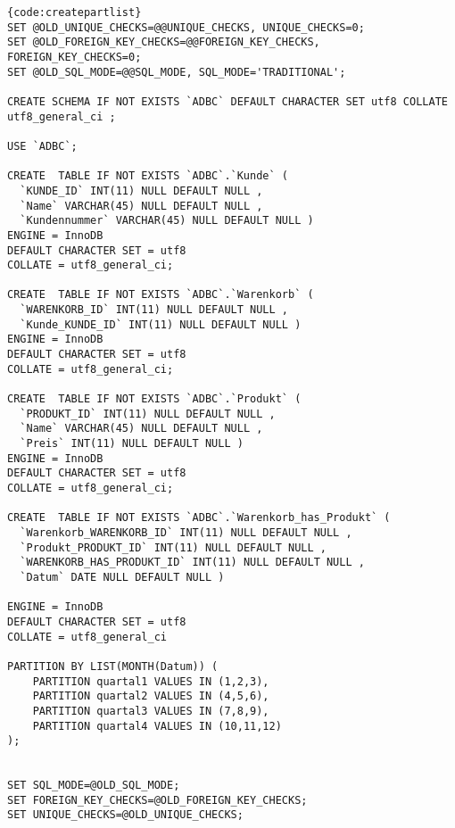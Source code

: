 \begin{lstlisting}[caption=Tabellenerzeugung mit List-Partitioning, firstnumber=1]{code:createpartlist}
SET @OLD_UNIQUE_CHECKS=@@UNIQUE_CHECKS, UNIQUE_CHECKS=0;
SET @OLD_FOREIGN_KEY_CHECKS=@@FOREIGN_KEY_CHECKS, FOREIGN_KEY_CHECKS=0;
SET @OLD_SQL_MODE=@@SQL_MODE, SQL_MODE='TRADITIONAL';

CREATE SCHEMA IF NOT EXISTS `ADBC` DEFAULT CHARACTER SET utf8 COLLATE utf8_general_ci ;

USE `ADBC`;

CREATE  TABLE IF NOT EXISTS `ADBC`.`Kunde` (
  `KUNDE_ID` INT(11) NULL DEFAULT NULL ,
  `Name` VARCHAR(45) NULL DEFAULT NULL ,
  `Kundennummer` VARCHAR(45) NULL DEFAULT NULL )
ENGINE = InnoDB
DEFAULT CHARACTER SET = utf8
COLLATE = utf8_general_ci;

CREATE  TABLE IF NOT EXISTS `ADBC`.`Warenkorb` (
  `WARENKORB_ID` INT(11) NULL DEFAULT NULL ,
  `Kunde_KUNDE_ID` INT(11) NULL DEFAULT NULL )
ENGINE = InnoDB
DEFAULT CHARACTER SET = utf8
COLLATE = utf8_general_ci;

CREATE  TABLE IF NOT EXISTS `ADBC`.`Produkt` (
  `PRODUKT_ID` INT(11) NULL DEFAULT NULL ,
  `Name` VARCHAR(45) NULL DEFAULT NULL ,
  `Preis` INT(11) NULL DEFAULT NULL )
ENGINE = InnoDB
DEFAULT CHARACTER SET = utf8
COLLATE = utf8_general_ci;

CREATE  TABLE IF NOT EXISTS `ADBC`.`Warenkorb_has_Produkt` (
  `Warenkorb_WARENKORB_ID` INT(11) NULL DEFAULT NULL ,
  `Produkt_PRODUKT_ID` INT(11) NULL DEFAULT NULL ,
  `WARENKORB_HAS_PRODUKT_ID` INT(11) NULL DEFAULT NULL ,
  `Datum` DATE NULL DEFAULT NULL )
    
ENGINE = InnoDB
DEFAULT CHARACTER SET = utf8
COLLATE = utf8_general_ci

PARTITION BY LIST(MONTH(Datum)) (
    PARTITION quartal1 VALUES IN (1,2,3),
    PARTITION quartal2 VALUES IN (4,5,6),
    PARTITION quartal3 VALUES IN (7,8,9),
    PARTITION quartal4 VALUES IN (10,11,12)
);


SET SQL_MODE=@OLD_SQL_MODE;
SET FOREIGN_KEY_CHECKS=@OLD_FOREIGN_KEY_CHECKS;
SET UNIQUE_CHECKS=@OLD_UNIQUE_CHECKS;

\end{lstlisting}

